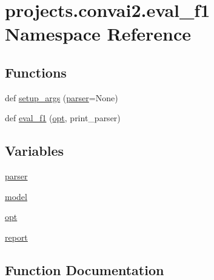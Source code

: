 \hypertarget{namespaceprojects_1_1convai2_1_1eval__f1}{}\section{projects.\+convai2.\+eval\+\_\+f1 Namespace Reference}
\label{namespaceprojects_1_1convai2_1_1eval__f1}
\subsection*{Functions}
\begin{DoxyCompactItemize}
\item 
def \hyperlink{namespaceprojects_1_1convai2_1_1eval__f1_a74826f78ce1ce6c9fe9b6d4a6297f3bd}{setup\+\_\+args} (\hyperlink{namespaceprojects_1_1convai2_1_1eval__f1_a3efde38a524a91904e2fbd8d29046f7f}{parser}=None)
\item 
def \hyperlink{namespaceprojects_1_1convai2_1_1eval__f1_aac16a2ead8ff2b896c82411fe262f449}{eval\+\_\+f1} (\hyperlink{namespaceprojects_1_1convai2_1_1eval__f1_a9622e1db762a5bc878e5279b0a10a56c}{opt}, print\+\_\+parser)
\end{DoxyCompactItemize}
\subsection*{Variables}
\begin{DoxyCompactItemize}
\item 
\hyperlink{namespaceprojects_1_1convai2_1_1eval__f1_a3efde38a524a91904e2fbd8d29046f7f}{parser}
\item 
\hyperlink{namespaceprojects_1_1convai2_1_1eval__f1_aeae95142bd810ef6bcc865a5ccb3c1b6}{model}
\item 
\hyperlink{namespaceprojects_1_1convai2_1_1eval__f1_a9622e1db762a5bc878e5279b0a10a56c}{opt}
\item 
\hyperlink{namespaceprojects_1_1convai2_1_1eval__f1_a01a47b9c08dad189837a51f085defc45}{report}
\end{DoxyCompactItemize}


\subsection{Function Documentation}
\mbox{\label{namespaceprojects_1_1convai2_1_1eval__f1_aac16a2ead8ff2b896c82411fe262f449}} 
